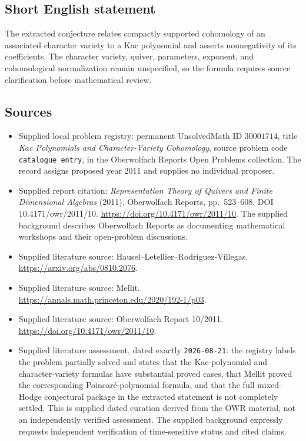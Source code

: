 \documentclass[11pt]{article}
\begin{document}
\subsection{Short English statement}
The extracted conjecture relates compactly supported cohomology of an associated character variety to a Kac polynomial and asserts nonnegativity of its coefficients. The character variety, quiver, parameters, exponent, and cohomological normalization remain unspecified, so the formula requires source clarification before mathematical review.
\subsection{Sources}
\begin{itemize}
\item Supplied local problem registry: permanent UnsolvedMath ID \(30001714\), title \emph{Kac Polynomials and Character-Variety Cohomology}, source problem code \texttt{catalogue entry}, in the Oberwolfach Reports Open Problems collection. The record assigns proposed year 2011 and supplies no individual proposer.
\item Supplied report citation: \emph{Representation Theory of Quivers and Finite Dimensional Algebras} (2011), Oberwolfach Reports, pp.~523--608, DOI 10.4171/owr/2011/10. \url{https://doi.org/10.4171/owr/2011/10}. The supplied background describes Oberwolfach Reports as documenting mathematical workshops and their open-problem discussions.
\item Supplied literature source: Hausel--Letellier--Rodriguez-Villegas. \url{https://arxiv.org/abs/0810.2076}.
\item Supplied literature source: Mellit. \url{https://annals.math.princeton.edu/2020/192-1/p03}.
\item Supplied literature source: Oberwolfach Report 10/2011. \url{https://doi.org/10.4171/owr/2011/10}.
\item Supplied literature assessment, dated exactly \texttt{2026-08-21}: the registry labels the problem partially solved and states that the Kac-polynomial and character-variety formulas have substantial proved cases, that Mellit proved the corresponding Poincar\'e-polynomial formula, and that the full mixed-Hodge conjectural package in the extracted statement is not completely settled. This is supplied dated curation derived from the OWR material, not an independently verified assessment. The supplied background expressly requests independent verification of time-sensitive status and cited claims.
\end{itemize}
\end{document}
